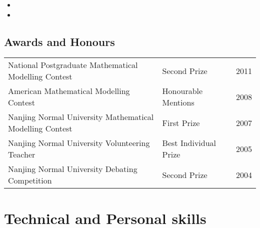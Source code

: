 \documentclass[12pt,a4paper,Times New Roman]{moderncv}        %
\begin{document}
\vspace{4pt}

\begin{itemize}

\item{}

\item{}

\end{itemize}

\vspace{2pt}

\subsection{Awards and Honours}

\vspace{4pt}

\begin{tabular}{lll}
National Postgraduate Mathematical Modelling Contest $\quad$ & Second Prize $\quad$ & 2011\\
American Mathematical Modelling Contest $\quad$ & Honourable Mentions $\quad$ & 2008\\
Nanjing Normal University Mathematical Modelling Contest $\quad$ & First Prize $\quad$ & 2007\\
Nanjing Normal University Volunteering Teacher $\quad$ & Best Individual Prize $\quad$ & 2005 \\
Nanjing Normal University Debating Competition $\quad$ & Second Prize $\quad$ & 2004
\end{tabular}

\section{Technical and Personal skills}

\vspace{4pt}
\end{document}
